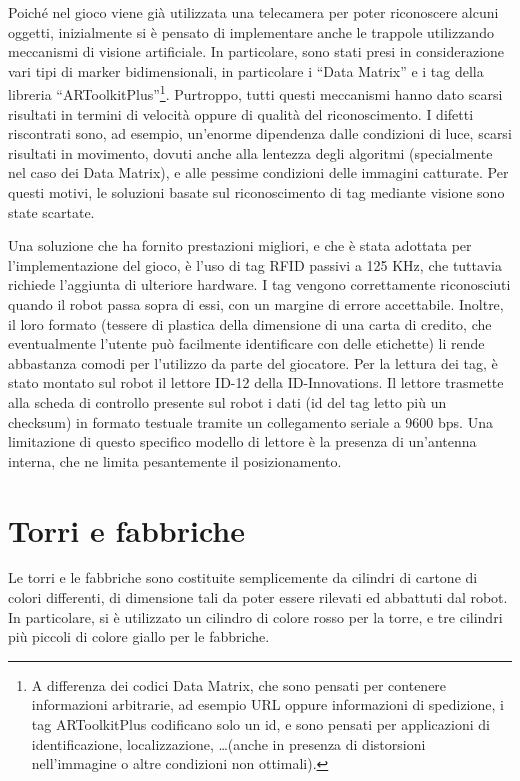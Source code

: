 Poiché nel gioco viene già utilizzata una telecamera per poter riconoscere alcuni oggetti, inizialmente si è pensato di implementare anche le trappole utilizzando meccanismi di visione artificiale. In particolare, sono stati presi in considerazione vari tipi di marker bidimensionali, in particolare i ``Data Matrix'' e i tag della libreria ``ARToolkitPlus''\footnote{A differenza dei codici Data Matrix, che sono pensati per contenere informazioni arbitrarie, ad esempio URL oppure informazioni di spedizione, i tag ARToolkitPlus codificano solo un id, e sono pensati per applicazioni di identificazione, localizzazione, \dots (anche in presenza di distorsioni nell'immagine o altre condizioni non ottimali).}. Purtroppo, tutti questi meccanismi hanno dato scarsi risultati in termini di velocità oppure di qualità del riconoscimento. I difetti riscontrati sono, ad esempio, un'enorme dipendenza dalle condizioni di luce, scarsi risultati in movimento, dovuti anche alla lentezza degli algoritmi (specialmente nel caso dei Data Matrix), e alle pessime condizioni delle immagini catturate. Per questi motivi, le soluzioni basate sul riconoscimento di tag mediante visione sono state scartate.

Una soluzione che ha fornito prestazioni migliori, e che è stata adottata per l'implementazione del gioco, è l'uso di tag RFID passivi a 125 KHz, che tuttavia richiede l'aggiunta di ulteriore hardware. I tag vengono correttamente riconosciuti quando il robot passa sopra di essi, con un margine di errore accettabile. Inoltre, il loro formato (tessere di plastica della dimensione di una carta di credito, che eventualmente l'utente può facilmente identificare con delle etichette) li rende abbastanza comodi per l'utilizzo da parte del giocatore. Per la lettura dei tag, è stato montato sul robot il lettore ID-12 della ID-Innovations\cite{idinnovations}. Il lettore trasmette alla scheda di controllo presente sul robot i dati (id del tag letto più un checksum) in formato testuale tramite un collegamento seriale a 9600 bps. Una limitazione di questo specifico modello di lettore è la presenza di un'antenna interna, che ne limita pesantemente il posizionamento.

\section{Torri e fabbriche}
Le torri e le fabbriche sono costituite semplicemente da cilindri di cartone di colori differenti, di dimensione tali da poter essere rilevati ed abbattuti dal robot. In particolare, si è utilizzato un cilindro di colore rosso per la torre, e tre cilindri più piccoli di colore giallo per le fabbriche. 

